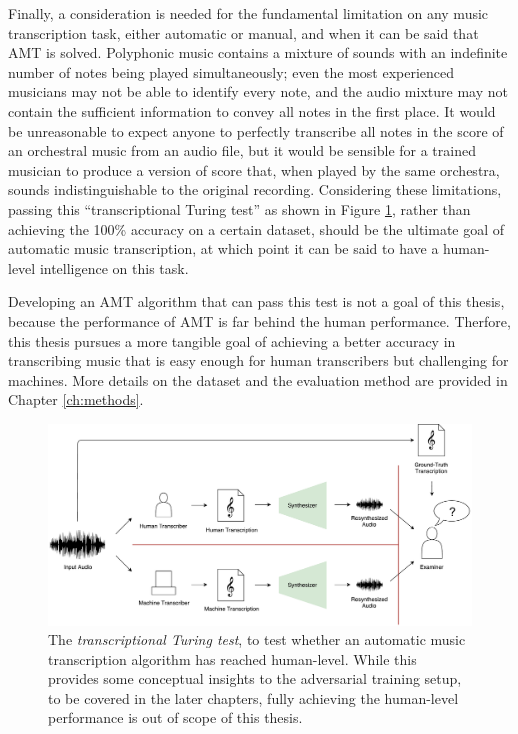 Finally, a consideration is needed for the fundamental limitation on any music transcription task, either automatic or manual, and when it can be said that AMT is solved.
Polyphonic music contains a mixture of sounds with an indefinite number of notes being played simultaneously; even the most experienced musicians may not be able to identify every note, and the audio mixture may not contain the sufficient information to convey all notes in the first place.
It would be unreasonable to expect anyone to perfectly transcribe all notes in the score of an orchestral music from an audio file, but it would be sensible for a trained musician to produce a version of score that, when played by the same orchestra, sounds indistinguishable to the original recording.
Considering these limitations, passing this ``transcriptional Turing test'' as shown in Figure \ref{fig:turing}, rather than achieving the 100\% accuracy on a certain dataset, should be the ultimate goal of automatic music transcription, at which point it can be said to have a human-level intelligence on this task.

Developing an AMT algorithm that can pass this test is not a goal of this thesis, because the performance of AMT is far behind the human performance.
Therfore, this thesis pursues a more tangible goal of achieving a better accuracy in transcribing music that is easy enough for human transcribers but challenging for machines.
More details on the dataset and the evaluation method are provided in Chapter \ref{ch:methods}. 


\begin{figure}
	\includegraphics[width=\textwidth]{turing.pdf}
	\caption{The \emph{transcriptional Turing test}, to test whether an automatic music transcription algorithm has reached human-level. While this provides some conceptual insights to the adversarial training setup, to be covered in the later chapters, fully achieving the human-level performance is out of scope of this thesis.}
	\label{fig:turing}
\end{figure}

